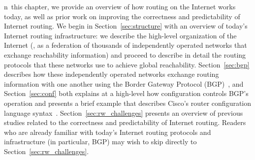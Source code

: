 



\label{chap:related}


n~this chapter, we provide an overview of how routing on the
Internet works today, as well as prior work on improving the correctness
and predictability of Internet routing.  We begin in
Section~\ref{sec:structure} with an overview of today's Internet routing
infrastructure: we describe the high-level organization of the Internet
(\ie, as a federation of thousands of independently operated networks
that exchange reachability information) and proceed to describe in
detail the routing protocols that these networks use to achieve global
reachability.
%
Section~\ref{sec:bgp} describes how these independently operated
networks exchange routing information with one another using the Border
Gateway Protocol (BGP)~\cite{rfc1771,id-bgp4}, and
Section~\ref{sec:conf} both explains at a high-level how configuration
controls BGP's operation and presents a brief example that describes
Cisco's router configuration language syntax~\cite{www-cisco-ios-master,www-juniper-command-ref}.
Section~\ref{sec:rw_challenges} presents an overview of previous studies
related to the correctness and predictability of Internet routing.
Readers who are already familiar with today's Internet routing protocols and
infrastructure (in particular, BGP) may wish to skip directly to
Section~\ref{sec:rw_challenges}.




